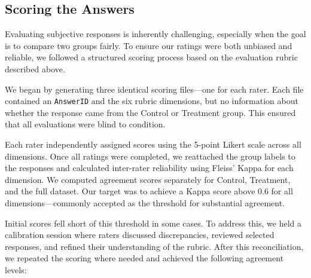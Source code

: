 \documentclass[sigconf, authorversion, nonacm, screen]{acmart}
\begin{document}
\subsection{Scoring the Answers}
Evaluating subjective responses is inherently challenging, especially when the goal is to compare two groups fairly. To ensure our ratings were both unbiased and reliable, we followed a structured scoring process based on the evaluation rubric described above.

We began by generating three identical scoring files---one for each rater. Each file contained an \texttt{AnswerID} and the six rubric dimensions, but no information about whether the response came from the Control or Treatment group. This ensured that all evaluations were blind to condition.

Each rater independently assigned scores using the 5-point Likert scale across all dimensions. Once all ratings were completed, we reattached the group labels to the responses and calculated inter-rater reliability using Fleiss' Kappa for each dimension. We computed agreement scores separately for Control, Treatment, and the full dataset. Our target was to achieve a Kappa score above 0.6 for all dimensions---commonly accepted as the threshold for substantial agreement.

Initial scores fell short of this threshold in some cases. To address this, we held a calibration session where raters discussed discrepancies, reviewed selected responses, and refined their understanding of the rubric. After this reconciliation, we repeated the scoring where needed and achieved the following agreement levels:

\begin{table}[H]
\centering
\caption{Fleiss' Kappa Scores by Dimension and Group}
\label{tab:kappa}
\end{table}
\end{document}
